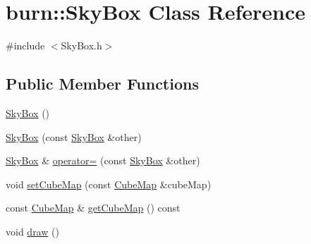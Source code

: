 \hypertarget{classburn_1_1_sky_box}{\section{burn\-:\-:Sky\-Box Class Reference}
\label{classburn_1_1_sky_box}
}


{\ttfamily \#include $<$Sky\-Box.\-h$>$}

\subsection*{Public Member Functions}
\begin{DoxyCompactItemize}
\item 
\hyperlink{classburn_1_1_sky_box_a43918ed26a1a03a41c34dc76b3da52a1}{Sky\-Box} ()
\item 
\hyperlink{classburn_1_1_sky_box_ad9d9c8bc70ea6cc9c7e3bc88a2ce5c4e}{Sky\-Box} (const \hyperlink{classburn_1_1_sky_box}{Sky\-Box} \&other)
\item 
\hyperlink{classburn_1_1_sky_box}{Sky\-Box} \& \hyperlink{classburn_1_1_sky_box_afe7077120c512a6fd5c2823c014ff125}{operator=} (const \hyperlink{classburn_1_1_sky_box}{Sky\-Box} \&other)
\item 
void \hyperlink{classburn_1_1_sky_box_ad77620d575b71d071e88120f6b6e145e}{set\-Cube\-Map} (const \hyperlink{classburn_1_1_cube_map}{Cube\-Map} \&cube\-Map)
\item 
const \hyperlink{classburn_1_1_cube_map}{Cube\-Map} \& \hyperlink{classburn_1_1_sky_box_aa7ec0fde41d2c0ffeacb7cfc64c85b80}{get\-Cube\-Map} () const 
\item 
void \hyperlink{classburn_1_1_sky_box_a700e08af93b54c0fb23ad225d3e6be5c}{draw} ()
\end{DoxyCompactItemize}


